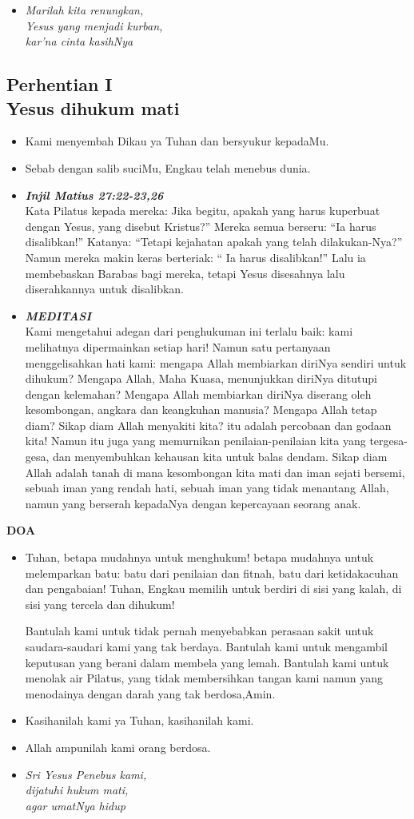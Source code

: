 \documentclass[a5paper,titlepage,11pt,openany]{scrbook}
\newcommand{\BU}[1]{\begin{itemize} \item[U:] #1 \end{itemize}}
\newcommand{\BP}[1]{\begin{itemize} \item[P:] #1 \end{itemize}}
\newcommand{\kamiMenyembah}{\BP{ Kami menyembah Dikau ya Tuhan dan bersyukur kepadaMu.}
\BU{Sebab dengan salib suciMu, Engkau telah menebus dunia.}
}
\newcommand{\kasihanilahKami}{\BP{Kasihanilah kami ya Tuhan, kasihanilah kami.}
\BU{Allah ampunilah kami orang berdosa.}}
\newcommand{\BPi}[2]
{\begin{itemize} \item[P1:] \textbf{\emph{#1}}\\#2 \end{itemize}}
\newcommand{\BPii}[1]
{\begin{itemize} \item[P2:] \textbf{\emph{MEDITASI}}\\#1 \end{itemize}}
\newcommand{\lagu}[2]{%
\begin{itemize}
\item[#1.] \it{#2}
\end{itemize}}
\newcommand{\henti}[2]{%
\subsection*{Perhentian #1\\#2 } 
\kamiMenyembah
}
\begin{document}
\lagu{1}{Marilah kita renungkan,\\
Yesus yang menjadi kurban,\\
kar'na cinta kasihNya}

\henti{I}{Yesus dihukum mati}

\BPi{Injil Matius 27:22-23,26 }{
Kata Pilatus kepada mereka: Jika begitu, apakah yang harus kuperbuat dengan Yesus, yang disebut Kristus?'' Mereka semua berseru: ``Ia harus disalibkan!'' Katanya: ``Tetapi kejahatan apakah yang telah dilakukan-Nya?'' Namun mereka makin keras berteriak: `` Ia harus disalibkan!'' Lalu ia membebaskan Barabas bagi mereka, tetapi Yesus disesahnya lalu diserahkannya untuk disalibkan. }

\BPii{
Kami mengetahui adegan dari penghukuman ini terlalu baik: kami melihatnya dipermainkan setiap hari! Namun satu pertanyaan menggelisahkan hati kami: mengapa Allah membiarkan diriNya sendiri untuk dihukum? Mengapa Allah, Maha Kuasa, menunjukkan diriNya ditutupi dengan kelemahan? Mengapa Allah membiarkan diriNya diserang oleh kesombongan, angkara dan keangkuhan manusia? Mengapa Allah tetap diam? Sikap diam Allah menyakiti kita? itu adalah percobaan dan godaan kita! Namun itu juga yang memurnikan penilaian-penilaian kita yang tergesa-gesa, dan menyembuhkan kehausan kita untuk balas dendam. Sikap diam Allah adalah tanah di mana kesombongan kita mati dan iman sejati bersemi, sebuah iman yang rendah hati, sebuah iman yang tidak menantang Allah, namun yang berserah kepadaNya dengan kepercayaan seorang anak. }


\textbf{DOA }


\BU{Tuhan, betapa mudahnya untuk menghukum! betapa mudahnya untuk melemparkan batu: batu dari penilaian dan fitnah, batu dari ketidakacuhan dan pengabaian! Tuhan, Engkau memilih untuk berdiri di sisi yang kalah, di sisi yang tercela dan dihukum!

Bantulah kami untuk tidak pernah menyebabkan perasaan sakit untuk saudara-saudari kami yang tak berdaya. Bantulah kami untuk mengambil keputusan yang berani dalam membela yang lemah. Bantulah kami untuk menolak air Pilatus, yang tidak membersihkan tangan kami namun yang menodainya dengan darah yang tak berdosa,Amin.}


\kasihanilahKami

\lagu{2}{Sri Yesus Penebus kami,\\
dijatuhi hukum mati,\\
agar umatNya hidup}
\end{document}
